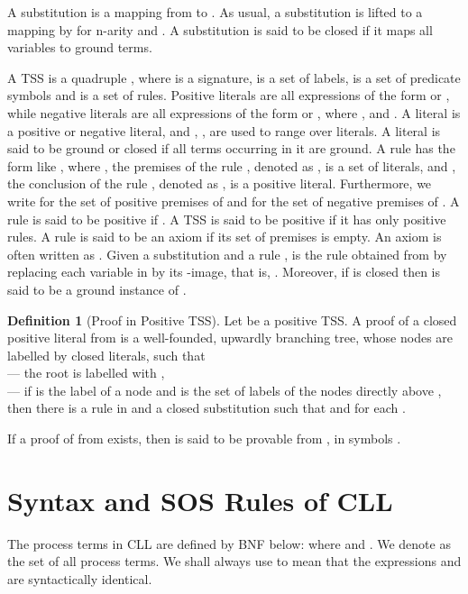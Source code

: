 \documentclass{elsarticle}
\theoremstyle{plain}
\theoremstyle{definition}
\newtheorem{mydefn}[theorem]{Definition}
\begin{document}
    A substitution  is a mapping from  to .  As usual, a substitution  is lifted to a mapping  by  for n-arity  and . A substitution is said to be closed if it maps all variables to ground terms.


    A TSS is a quadruple , where  is a signature,  is a set of labels,  is a set of predicate symbols and  is a set of rules.
    Positive literals are all expressions of the form  or , while negative literals are all expressions of the form  or , where ,  and .
A literal is a positive or negative literal, and , ,  are used to range over literals.
    A literal is said to be ground or closed if all terms occurring in it are ground.
    A rule  has the form like , where , the premises of the rule , denoted as , is a set of literals, and , the conclusion of the rule , denoted as , is a positive literal. Furthermore, we write  for the set of positive premises of  and  for the set of negative premises of . A rule  is said to be positive if . A TSS is said to be  positive if it has only positive rules. A rule is said to be an axiom if its set of premises is empty. An axiom  is often written as .
    Given a substitution  and a rule ,  is the rule obtained from  by replacing each variable in  by its -image, that is, .
    Moreover, if  is closed then  is said to be a ground instance of .



\begin{mydefn}[Proof in Positive TSS]
    Let  be a positive TSS. A proof of a closed positive literal  from  is a well-founded, upwardly branching tree, whose nodes are labelled by closed literals, such that\\
    --- the root is labelled with ,\\
    --- if  is the label of a node  and  is the set of labels of the nodes directly above , then there is a rule  in  and a closed substitution  such that  and  for each .

    If a proof of  from  exists, then  is said to be provable from , in symbols .
\end{mydefn}


\section{Syntax and SOS Rules of CLL}


The process terms in CLL are defined by BNF below:
 where  and  .
We denote  as the set of all process terms. We shall always use  to mean that the expressions  and  are syntactically identical.
\end{document}

